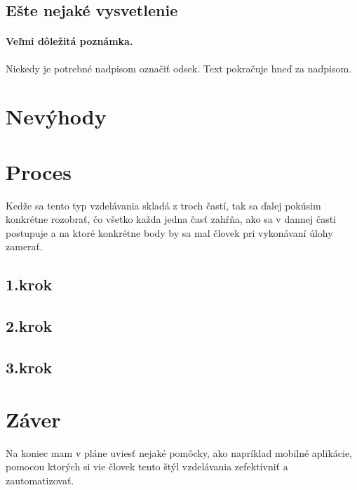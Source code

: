 \documentclass[10pt,twoside,slovak,a4paper]{article} %
\begin{document}
\subsection{Ešte nejaké vysvetlenie} \label{ina:este}

\paragraph{Veľmi dôležitá poznámka.}
Niekedy je potrebné nadpisom označiť odsek. Text pokračuje hneď za nadpisom.



\section{Nevýhody} \label{dolezita}




\section{Proces} \label{dolezitejsia}
Kedže sa
tento typ vzdelávania skladá z troch častí, tak sa ďalej pokúsim konkrétne
rozobrať, čo všetko každa jedna časť zahŕňa, ako sa v dannej časti postupuje a
na ktoré konkrétne body by sa mal človek pri vykonávaní úlohy zamerať.

\subsection{1.krok}
\subsection{2.krok}
\subsection{3.krok}






\section{Záver} \label{zaver} %
Na koniec mam v pláne uviesť nejaké pomôcky, ako napríklad mobilné aplikácie,
pomocou ktorých si vie človek tento štýl vzdelávania zefektívniť a
zautomatizovať.






\end{document}
